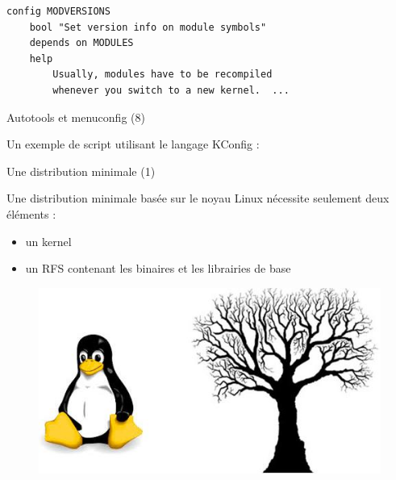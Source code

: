 \documentclass[12pt, t]{beamer}
\newcommand{\bi}{\begin{itemize}}
\newcommand{\ei}{\end{itemize}}
\begin{document}
{
    \begin{lstlisting}
config MODVERSIONS
	bool "Set version info on module symbols"
	depends on MODULES
	help
        Usually, modules have to be recompiled
        whenever you switch to a new kernel.  ...
    \end{lstlisting}
}

\begin{frame}{Autotools et menuconfig (8)}

    \vspace{15pt}
    Un exemple de script utilisant le langage KConfig :
    \vspace{5pt}
    \lstkconf
\end{frame}

\begin{frame}{Une distribution minimale (1)}

    \vspace{15pt}
    Une distribution minimale basée sur le noyau Linux nécessite seulement
    deux éléments :
    \bi
    \itemsep6pt
    \item un kernel
    \item un RFS contenant les binaires et les librairies de base
    \ei

    \begin{figure}
        \centering
        \includegraphics[scale=0.5]{kernel_root.jpeg}
    \end{figure}

\end{frame}
\end{document}

